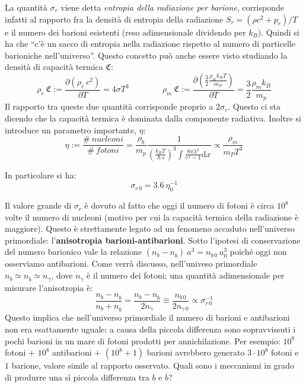 La quantità $\sigma_{r}$ viene detta \textit{entropia della radiazione per barione}, corrisponde infatti al rapporto fra la densità di entropia della radiazione $S_r= (\rho c^2 + p_r)/T$ e il numero dei barioni esistenti (reso adimensionale dividendo per $k_B$). Quindi si ha che ``c'è un sacco di entropia nella radiazione rispetto al numero di particelle barioniche nell'universo''. Questo concetto può anche essere visto studiando la densità di capacità termica $\mathfrak{C}$:
$$
\rho_r ~\mathfrak{C}:=\frac{\partial \left (\rho_r ~c^2  \right )}{\partial T}=4\sigma T^3 \qquad\qquad \rho_m ~\mathfrak{C}:=\frac{\partial\left ( \frac{3}{2}\frac{\rho_m k_B T}{m_P}  \right )}{\partial T} = \frac{3}{2}\frac{\rho_m k_B}{m_p}
$$
Il rapporto tra queste due quantità corrisponde proprio a $2\sigma_{r}$. Questo ci sta dicendo che la capacità termica è dominata dalla componente radiativa.
Inoltre si introduce un parametro importante, $\eta$:
\begin{equation}
    \eta := \frac{\# ~nucleoni}{\# ~fotoni} = \frac{\rho_b}{m_p} \frac{1}{ \left( \frac{k_B T}{\hslash c}\right)^3 \int \frac{8 \pi \lambda^2}{e^x - 1} \mathrm{d}x} \propto \frac{\rho_m}{m_P T^3}
\end{equation}

In particolare si ha:
\begin{equation}
    \sigma_{r \, 0 } = 3.6 ~ \eta_0^{-1}
\end{equation}

Il valore grande di $\sigma_{r}$ è dovuto al fatto che oggi il numero di fotoni è circa $10^8$ volte il numero di nucleoni (motivo per cui la capacità termica della radiazione è maggiore). Questo è strettamente legato ad un fenomeno accaduto nell'universo primordiale: l'\textbf{anisotropia barioni-antibarioni}. Sotto l'ipotesi di conservazione del numero barionico vale la relazione $(n_b - n_{\overbar{b}} )~a^3 = n_{b \,0}~a_0^3$ poiché oggi non osserviamo antibarioni. Come verrà discusso, nell'univeso primordiale $n_b \simeq n_{\overbar{b}} \simeq n_\gamma $, dove $n_\gamma $ è il numero dei fotoni; una quantità adimensionale per misurare l'anisotropia è:
\begin{equation}
    \frac{n_b - n_{\overbar{b}}}{n_b + n_{\overbar{b}}}= \frac{n_b - n_{\overbar{b}}}{2 n_\gamma} \equiv \frac{n_{b \,0}}{2n_{\gamma \,0}} \propto \sigma_{r \, 0 }^{-1}
\end{equation}
Questo implica che nell'universo primordiale il numero di barioni e antibarioni non era esattamente uguale: a causa della piccola differenza sono sopravvissuti i pochi barioni in un mare di fotoni prodotti per annichilazione. Per esempio: $10^8$ fotoni $+$ $10^8$ antibarioni $+$ $(10^8 +1)$ barioni avrebbero generato $3\cdot 10^8$ fotoni e $1$ barione, valore simile al rapporto osservato. Quali sono i meccanismi in grado di produrre una sì piccola differenza tra $b$ e $\overbar{b}$?

